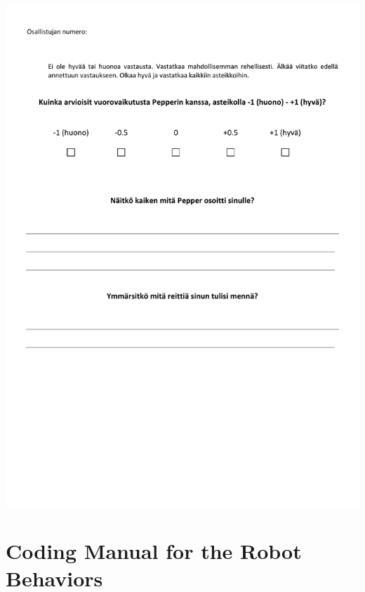 \begin{center}
	\includegraphics[width=\textwidth]{figures/annexe1/Questionnaire.pdf} 
\end{center}

\section{Coding Manual for the Robot Behaviors}\label{app:coding_r}

